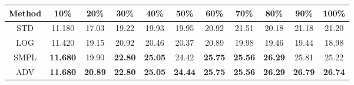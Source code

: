 \documentclass{standalone}
\begin{document}
\begin{tabular}{c|cccccccccc}
      \toprule
      Method & 10\% & 20\% & 30\% & 40\% & 50\% & 60\% & 70\% & 80\% & 90\% & 100\% \\
      \midrule
STD & 11.180 & 17.03 & 19.22 & 19.93 & 19.95 & 20.92 & 21.51 & 20.18 & 21.18 & 21.20\\
LOG & 11.420 & 19.15 & 20.92 & 20.46 & 20.37 & 20.89 & 19.98 & 19.46 & 19.44 & 18.98\\
SMPL & \textbf{11.680} & 19.90 & \textbf{22.80} & \textbf{25.05} & 24.42 & \textbf{25.75} & \textbf{25.56} & \textbf{26.29} & 25.81 & 25.22\\
ADV & \textbf{11.680} & \textbf{20.89} & \textbf{22.80} & \textbf{25.05} & \textbf{24.44} & \textbf{25.75} & \textbf{25.56} & \textbf{26.29} & \textbf{26.79} & \textbf{26.74}\\
  \bottomrule
\end{tabular}
\end{document}
